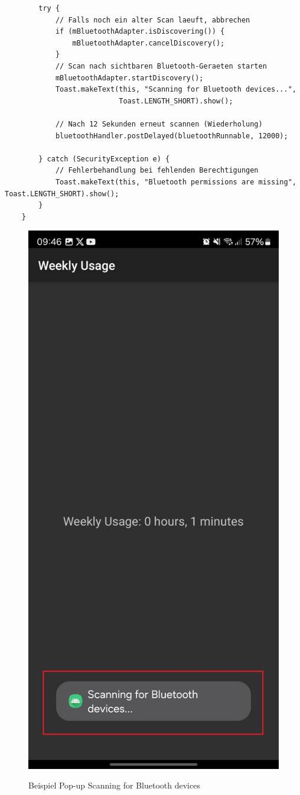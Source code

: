 \documentclass[a4paper, 12pt]{article} %
\begin{document}
\begin{spacing}{1.8}
\begin{lstlisting}
        try {
            // Falls noch ein alter Scan laeuft, abbrechen
            if (mBluetoothAdapter.isDiscovering()) {
                mBluetoothAdapter.cancelDiscovery();
            }
            // Scan nach sichtbaren Bluetooth-Geraeten starten
            mBluetoothAdapter.startDiscovery();
            Toast.makeText(this, "Scanning for Bluetooth devices...",
                           Toast.LENGTH_SHORT).show();
    
            // Nach 12 Sekunden erneut scannen (Wiederholung)
            bluetoothHandler.postDelayed(bluetoothRunnable, 12000);
    
        } catch (SecurityException e) {
            // Fehlerbehandlung bei fehlenden Berechtigungen
            Toast.makeText(this, "Bluetooth permissions are missing", Toast.LENGTH_SHORT).show();
        }
    }
    \end{lstlisting}

    \begin{figure}[H]
        \includegraphics[width=0.5\linewidth]{images/Screenshot_20250113_094628_Bluetooth App.jpg}\\[1ex]
        \centering
        \caption{Beispiel Pop-up Scanning for Bluetooth devices\cite{lukiano12_lkw_assist}}
        \label{ABBILDUNG 76}
    \end{figure}


\end{spacing}
\end{document}
